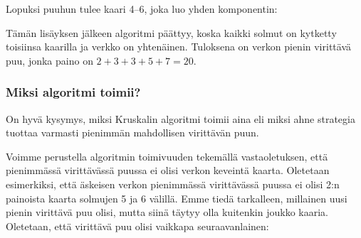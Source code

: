 \begin{samepage}
Lopuksi puuhun tulee kaari 4--6,
joka luo yhden komponentin:

\begin{center}
\end{center}
\end{samepage}

Tämän lisäyksen jälkeen algoritmi päättyy,
koska kaikki solmut on kytketty toisiinsa kaarilla
ja verkko on yhtenäinen.
Tuloksena on verkon pienin virittävä puu,
jonka paino on $2+3+3+5+7=20$.

\subsubsection{Miksi algoritmi toimii?}

On hyvä kysymys, miksi Kruskalin algoritmi
toimii aina eli miksi ahne strategia tuottaa
varmasti pienimmän mahdollisen virittävän puun.

Voimme perustella algoritmin toimivuuden
tekemällä vastaoletuksen, että pienimmässä
virittävässä puussa ei olisi verkon keveintä kaarta.
Oletetaan esimerkiksi, että äskeisen verkon
pienimmässä virittävässä puussa ei olisi
2:n painoista kaarta solmujen 5 ja 6 välillä.
Emme tiedä tarkalleen, millainen uusi pienin
virittävä puu olisi, mutta siinä täytyy olla
kuitenkin joukko kaaria.
Oletetaan, että virittävä puu olisi
vaikkapa seuraavanlainen:

\begin{center}
\end{center}

